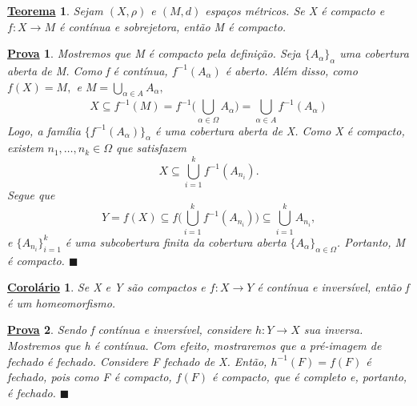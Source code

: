 \documentclass{article}
\newtheorem*{theorem*}{\underline{Teorema}}
\newtheorem*{crl*}{\underline{Corolário}}
\newtheorem*{proof*}{\underline{Prova}}
\renewcommand\qedsymbol{$\blacksquare$}
\begin{document}
\begin{theorem*}
  Sejam \((X, \rho )\) e \((M, d)\) espaços métricos. Se X é compacto e \(f:X\rightarrow M\) é contínua e sobrejetora, então M é compacto.
\end{theorem*}
\begin{proof*}
  Mostremos que M é compacto pela definição. Seja \(\{A_{\alpha }\}_{\alpha }\) uma cobertura aberta de M. Como f é contínua,
 \(f^{-1}(A_{\alpha })\) é aberto. Além disso, como \(f(X) = M,\) e \(M = \bigcup_{\alpha \in A}^{}A_{\alpha },\)
  \[
    X \subseteq f^{-1}(M) = f^{-1}\biggl(\bigcup_{\alpha \in \Omega }^{}A_{\alpha }\biggr) = \bigcup_{\alpha \in A}^{}f^{-1}(A_{\alpha })
  \]
  Logo, a família \(\{f^{-1}(A_{\alpha })\}_{\alpha }\) é uma cobertura aberta de X. Como X é compacto, existem \(n_{1}, \dotsc, n_{k}\in \Omega \)
que satisfazem 
  \[
    X\subseteq \bigcup_{i=1}^{k}f^{-1}(A_{n_{i}}).
  \]
  Segue que 
    \[
      Y = f(X)\subseteq f \biggl(\bigcup_{i=1}^{k}f^{-1}(A_{n_{i}})\biggr)\subseteq \bigcup_{i=1}^{k}A_{n_{i}},
    \]
    e \(\{A_{n_{i}}\}_{i=1}^{k}\) é uma subcobertura finita da cobertura aberta \(\{A_{\alpha }\}_{\alpha \in \Omega }\). Portanto,
M é compacto. \qedsymbol
\end{proof*}
\begin{crl*}
  Se X e Y são compactos e \(f:X\rightarrow Y\) é contínua e inversível, então f é um homeomorfismo.
\end{crl*}
\begin{proof*}
  Sendo f contínua e inversível, considere \(h:Y\rightarrow X\) sua inversa. Mostremos que h é contínua.
Com efeito, mostraremos que a pré-imagem de fechado é fechado. Considere F fechado de X. Então,
 \(h^{-1}(F) = f(F)\) é fechado, pois como F é compacto, \(f(F)\) é compacto, que é completo e, portanto, é fechado. \qedsymbol
\end{proof*}
\end{document}
